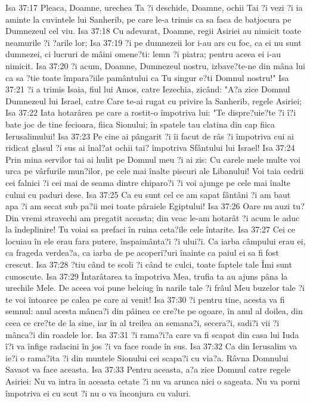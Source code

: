 Isa 37:17  Pleaca, Doamne, urechea Ta ?i deschide, Doamne, ochii Tai ?i vezi ?i ia aminte la cuvintele lui Sanherib, pe care le-a trimis ca sa faca de batjocura pe Dumnezeul cel viu.
Isa 37:18  Cu adevarat, Doamne, regii Asiriei au nimicit toate neamurile ?i ?arile lor;
Isa 37:19  ?i pe dumnezeii lor i-au ars cu foc, ca ei nu sunt dumnezei, ci lucruri de mâini omene?ti: lemn ?i piatra; pentru aceea ei i-au nimicit.
Isa 37:20  ?i acum, Doamne, Dumnezeul nostru, izbave?te-ne din mâna lui ca sa ?tie toate împara?iile pamântului ca Tu singur e?ti Domnul nostru!"
Isa 37:21  ?i a trimis Isaia, fiul lui Amos, catre Iezechia, zicând: "A?a zice Domnul Dumnezeul lui Israel, catre Care te-ai rugat cu privire la Sanherib, regele Asiriei;
Isa 37:22  Iata hotarârea pe care a rostit-o împotriva lui: "Te dispre?uie?te ?i î?i bate joc de tine fecioara, fiica Sionului; în spatele tau clatina din cap fiica Ierusalimului!
Isa 37:23  Pe cine ai pângarit ?i îi facut de râs ?i împotriva cui ai ridicat glasul ?i sus ai înal?at ochii tai? împotriva Sfântului lui Israel!
Isa 37:24  Prin mina servilor tai ai hulit pe Domnul meu ?i ai zis: Cu carele mele multe voi urca pe vârfurile mun?ilor, pe cele mai înalte piscuri ale Libanului! Voi taia cedrii cei falnici ?i cei mai de seama dintre chiparo?i ?i voi ajunge pe cele mai înalte culmi cu paduri dese.
Isa 37:25  Ca eu sunt cel ce am sapat fântâni ?i am baut apa ?i am secat sub pa?ii mei toate pâraiele Egiptului!
Isa 37:26  Oare nu auzi tu? Din vremi stravechi am pregatit aceasta; din veac le-am hotarât ?i acum le aduc la îndeplinire! Tu voiai sa prefaci în ruina ceta?ile cele întarite.
Isa 37:27  Cei ce locuiau în ele erau fara putere, înspaimânta?i ?i ului?i. Ca iarba câmpului erau ei, ca frageda verdea?a, ca iarba de pe acoperi?uri înainte ca paiul ei sa fi fost crescut.
Isa 37:28  ?tiu când te scoli ?i când te culci, toate faptele tale Îmi sunt cunoscute.
Isa 37:29  Întarâtarea ta împotriva Mea, trufia ta au ajuns pâna la urechile Mele. De aceea voi pune belciug în narile tale ?i frâul Meu buzelor tale ?i te voi întoarce pe calea pe care ai venit!
Isa 37:30  ?i pentru tine, acesta va fi semnul: anul acesta mânca?i din pâinea ce cre?te pe ogoare, în anul al doilea, din ceea ce cre?te de la sine, iar în al treilea an semana?i, secera?i, sadi?i vii ?i mânca?i din roadele lor.
Isa 37:31  ?i rama?i?a care va fi scapat din casa lui Iuda î?i va înfige radacini în jos ?i va face roade în sus.
Isa 37:32  Ca din Ierusalim va ie?i o rama?ita ?i din muntele Sionului cei scapa?i cu via?a. Râvna Domnului Savaot va face aceasta.
Isa 37:33  Pentru aceasta, a?a zice Domnul catre regele Asiriei: Nu va intra în aceasta cetate ?i nu va arunca nici o sageata. Nu va porni împotriva ei cu scut ?i nu o va înconjura cu valuri.
